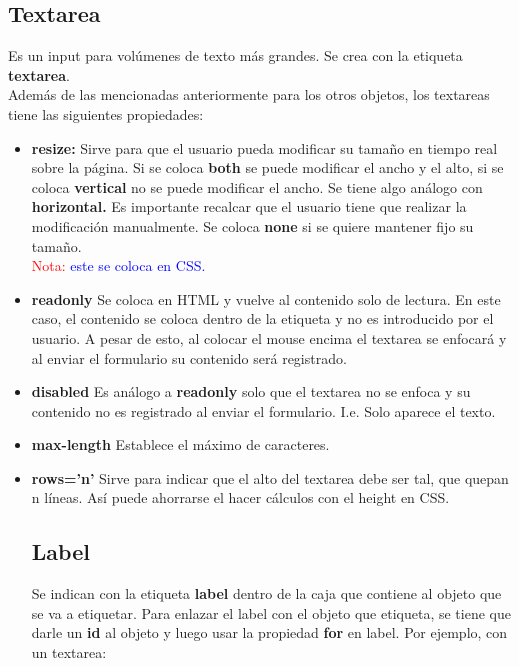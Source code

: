 \documentclass[10pt,oneside]{article}
\begin{document}
\begin{multicols}{2}
\subsection{Textarea}

    Es un input para volúmenes de texto más grandes. Se crea con la etiqueta \textbf{textarea}. \\ \newline Además de las mencionadas anteriormente para los otros objetos, los textareas tiene las siguientes propiedades:

    \begin{itemize}
        \item \textbf{resize:} Sirve para que el usuario pueda modificar su tamaño en tiempo real sobre la página. Si se coloca \textbf{both} se puede modificar el ancho y el alto, si se coloca \textbf{vertical} no se puede modificar el ancho. Se tiene algo análogo con \textbf{horizontal.} Es importante recalcar que el usuario tiene que realizar la modificación manualmente. Se coloca \textbf{none} si se quiere mantener fijo su tamaño. \\ \newline \textcolor{red}{Nota:} \textcolor{blue}{ este se coloca en CSS.}
        \item \textbf{readonly} Se coloca en HTML y vuelve al contenido solo de lectura. En este caso, el contenido se coloca dentro de la etiqueta y no es introducido por el usuario. A pesar de esto, al colocar el mouse encima el textarea se enfocará y al enviar el formulario su contenido será registrado.
        \item \textbf{disabled} Es análogo a \textbf{readonly} solo que el textarea no se enfoca y su contenido no es registrado al enviar el formulario. I.e. Solo aparece el texto.
        \item \textbf{max-length} Establece el máximo de caracteres.
        \item \textbf{rows='n'} Sirve para indicar que el alto del textarea debe ser tal, que quepan n líneas. Así puede ahorrarse el hacer cálculos con el height en CSS.

\subsection{Label} 

    Se indican con la etiqueta \textbf{label} dentro de la caja que contiene al objeto que se va a etiquetar. Para enlazar el label con el objeto que etiqueta, se tiene que darle un \textbf{id} al objeto y luego usar la propiedad \textbf{for} en label. Por ejemplo, con un textarea:
    

\end{itemize}
\end{multicols}
\end{document}
